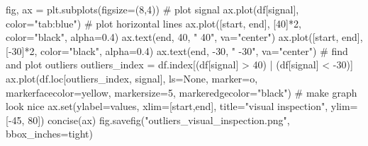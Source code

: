 \documentclass[
  letterpaper,
  DIV=11,
  numbers=noendperiod,
  oneside]{scrreprt}
\newenvironment{Shaded}{\begin{snugshade}}{\end{snugshade}}
\newcommand{\BuiltInTok}[1]{\textcolor[rgb]{0.00,0.23,0.31}{#1}}
\newcommand{\CommentTok}[1]{\textcolor[rgb]{0.37,0.37,0.37}{#1}}
\newcommand{\DecValTok}[1]{\textcolor[rgb]{0.68,0.00,0.00}{#1}}
\newcommand{\FloatTok}[1]{\textcolor[rgb]{0.68,0.00,0.00}{#1}}
\newcommand{\NormalTok}[1]{\textcolor[rgb]{0.00,0.23,0.31}{#1}}
\newcommand{\OperatorTok}[1]{\textcolor[rgb]{0.37,0.37,0.37}{#1}}
\newcommand{\StringTok}[1]{\textcolor[rgb]{0.13,0.47,0.30}{#1}}
\begin{document}
\begin{Shaded}
\begin{Highlighting}[]
\NormalTok{fig, ax }\OperatorTok{=}\NormalTok{ plt.subplots(figsize}\OperatorTok{=}\NormalTok{(}\DecValTok{8}\NormalTok{,}\DecValTok{4}\NormalTok{))}
\CommentTok{\# plot signal}
\NormalTok{ax.plot(df[}\StringTok{\textquotesingle{}signal\textquotesingle{}}\NormalTok{], color}\OperatorTok{=}\StringTok{"tab:blue"}\NormalTok{)}
\CommentTok{\# plot horizontal lines}
\NormalTok{ax.plot([start, end], [}\DecValTok{40}\NormalTok{]}\OperatorTok{*}\DecValTok{2}\NormalTok{, color}\OperatorTok{=}\StringTok{"black"}\NormalTok{, alpha}\OperatorTok{=}\FloatTok{0.4}\NormalTok{)}
\NormalTok{ax.text(end, }\DecValTok{40}\NormalTok{, }\StringTok{" 40"}\NormalTok{, va}\OperatorTok{=}\StringTok{"center"}\NormalTok{)}
\NormalTok{ax.plot([start, end], [}\OperatorTok{{-}}\DecValTok{30}\NormalTok{]}\OperatorTok{*}\DecValTok{2}\NormalTok{, color}\OperatorTok{=}\StringTok{"black"}\NormalTok{, alpha}\OperatorTok{=}\FloatTok{0.4}\NormalTok{)}
\NormalTok{ax.text(end, }\OperatorTok{{-}}\DecValTok{30}\NormalTok{, }\StringTok{" {-}30"}\NormalTok{, va}\OperatorTok{=}\StringTok{"center"}\NormalTok{)}
\CommentTok{\# find and plot outliers}
\NormalTok{outliers\_index }\OperatorTok{=}\NormalTok{ df.index[(df[}\StringTok{\textquotesingle{}signal\textquotesingle{}}\NormalTok{] }\OperatorTok{\textgreater{}} \DecValTok{40}\NormalTok{) }\OperatorTok{|}\NormalTok{ (df[}\StringTok{\textquotesingle{}signal\textquotesingle{}}\NormalTok{] }\OperatorTok{\textless{}} \OperatorTok{{-}}\DecValTok{30}\NormalTok{)]}
\NormalTok{ax.plot(df.loc[outliers\_index, }\StringTok{\textquotesingle{}signal\textquotesingle{}}\NormalTok{], ls}\OperatorTok{=}\StringTok{\textquotesingle{}None\textquotesingle{}}\NormalTok{,}
\NormalTok{        marker}\OperatorTok{=}\StringTok{\textquotesingle{}o\textquotesingle{}}\NormalTok{, markerfacecolor}\OperatorTok{=}\StringTok{\textquotesingle{}yellow\textquotesingle{}}\NormalTok{, markersize}\OperatorTok{=}\DecValTok{5}\NormalTok{,}
\NormalTok{        markeredgecolor}\OperatorTok{=}\StringTok{"black"}\NormalTok{)}
\CommentTok{\# make graph look nice}
\NormalTok{ax.}\BuiltInTok{set}\NormalTok{(ylabel}\OperatorTok{=}\StringTok{\textquotesingle{}values\textquotesingle{}}\NormalTok{,}
\NormalTok{       xlim}\OperatorTok{=}\NormalTok{[start,end],}
\NormalTok{       title}\OperatorTok{=}\StringTok{"visual inspection"}\NormalTok{,}
\NormalTok{       ylim}\OperatorTok{=}\NormalTok{[}\OperatorTok{{-}}\DecValTok{45}\NormalTok{, }\DecValTok{80}\NormalTok{])}
\NormalTok{concise(ax)}
\NormalTok{fig.savefig(}\StringTok{"outliers\_visual\_inspection.png"}\NormalTok{, bbox\_inches}\OperatorTok{=}\StringTok{\textquotesingle{}tight\textquotesingle{}}\NormalTok{)}
\end{Highlighting}
\end{Shaded}
\end{document}
